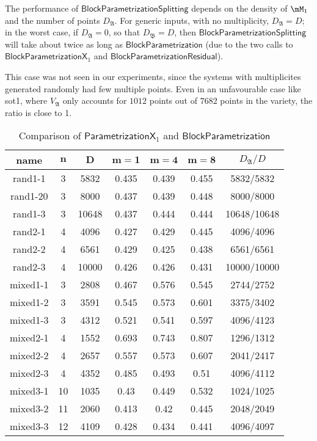 \documentclass[12pt]{article}
\newcommand{\mainalgoname}{\mathsf{ BlockParametrization}}
\begin{document}
The performance of $\mathsf{BlockParametrizationSplitting}$ depends on
the density of $\mM_1$ and the number of points $D_\mathfrak{A}$.  For
generic inputs, with no multiplicity, $D_\mathfrak{A}=D$; in the worst
case, if $D_\mathfrak{A}=0$, so that $D_\mathfrak{B}=D$, then
$\mathsf{BlockParametrizationSplitting}$ will take about twice as long
as $\mainalgoname$ (due to the two calls to
$\mathsf{BlockParametrizationX}_1$ and
$\mathsf{BlockParametrizationResidual}$).

This case was not seen in our experiments, since the systems with
multiplicites generated randomly had few multiple points. Even in an
unfavourable case like sot1, where $V_\mathfrak{A}$ only accounts for
$1012$ points out of $7682$ points in the variety, the ratio is close
to 1.

\begin{table}[H]
 \def\arraystretch{1.2}
\setlength\tabcolsep{6pt}
	\caption{Comparison of $\mathsf{ParametrizationX}_1$ and $\mainalgoname$}
        \begin{center}
\begin{tabular}{c|c|c|c|c|c|c}
\textbf{name}& $\bm{n}$ & $\bm{D}$ & $\bm{m = 1}$ & $\bm{m = 4}$ & $\bm{m = 8}$&$D_\mathfrak{A}/D$\\
\hline
rand1-1&3 &5832&0.435&0.439&0.455&5832/5832\\
rand1-20&3 &8000&0.437&0.439&0.448&8000/8000\\
rand1-3&3 &10648&0.437&0.444&0.444&10648/10648\\
rand2-1&4 &4096&0.427&0.429&0.445&4096/4096\\
rand2-2&4 &6561&0.429&0.425&0.438&6561/6561\\
rand2-3&4 &10000&0.426&0.426&0.431&10000/10000\\
mixed1-1&3 &2808&0.467&0.576&0.545& 2744/2752\\
mixed1-2&3 &3591&0.545&0.573&0.601& 3375/3402\\
mixed1-3&3 &4312&0.521&0.541&0.597& 4096/4123\\
mixed2-1&4 &1552&0.693&0.743&0.807& 1296/1312\\
mixed2-2&4 &2657&0.557&0.573&0.607& 2041/2417\\
mixed2-3&4 &4352&0.485&0.493&0.51& 4096/4112\\
mixed3-1&10 &1035&0.43&0.449&0.532& 1024/1025\\
mixed3-2&11 &2060&0.413&0.42&0.445& 2048/2049\\
mixed3-3&12 &4109&0.428&0.434&0.441& 4096/4097\\

\end{tabular}
\end{center}
\end{table}
\end{document}
